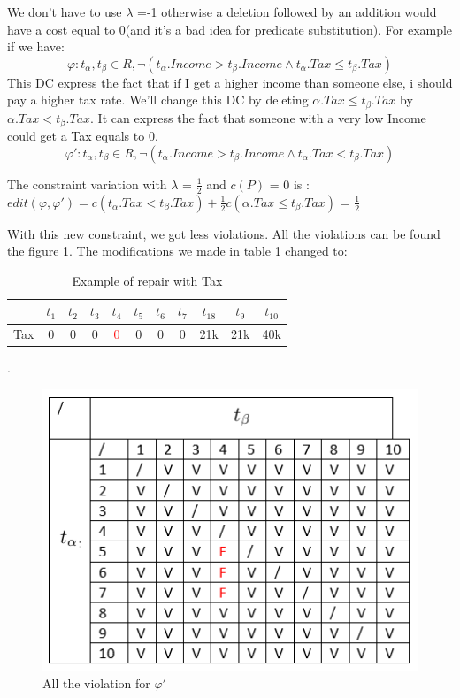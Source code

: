 \documentclass[letterpaper, 12pt]{report}
\begin{document}
We don't have to use $\lambda$ =-1 otherwise a deletion followed by an addition would have a cost equal to 0(and it's a bad idea for predicate substitution). For example if we have:
$$ \varphi : t_\alpha,t_\beta \in R, \neg(t_\alpha.Income > t_\beta.Income \wedge t_\alpha.Tax \leq t_\beta.Tax)$$
This DC express the fact that if I get a higher income than someone else, i should pay a higher tax rate. We'll change this DC by deleting $\alpha.Tax \leq t_\beta.Tax$ by $\alpha.Tax < t_\beta.Tax$. It can express the fact that someone with a very low Income could get a Tax equals to 0.
$$ \varphi ' : t_\alpha,t_\beta \in R, \neg(t_\alpha.Income > t_\beta.Income \wedge t_\alpha.Tax < t_\beta.Tax)$$

The constraint variation with $\lambda$ = $\frac{1}{2}$ and $c(P)$ = 0 is : $edit(\varphi, \varphi') = c(t_\alpha.Tax < t_\beta.Tax) + \frac{1}{2} c(\alpha.Tax \leq t_\beta.Tax)$ = $\frac{1}{2}$

With this new constraint, we got less violations. All the violations can be found the figure \ref{GoodTax}. The modifications we made in table \ref{tableExample} changed to:

\begin{table}[H]
	\centering
	\begin{tabular}{|c|c c c c c c c c c c|}
	\hline
	   & $t_1$ & $t_2$ & $t_3$ &$t_4$ &$t_5$ &$t_6$ &$t_7$ &$t_18$ &$t_9$ &$t_10$ \\
	\hline
	 Tax & 0 & 0 & 0 & \textcolor{red}{0} & 0 & 0 & 0 & 21k & 21k & 40k\\
	 \hline
	\end{tabular}
	\caption{\label{tableExample} Example of repair with Tax}.
\end{table}


\begin{figure}
	\centering
	\includegraphics[scale=1]{img/TaxGood}
	\caption{\label{GoodTax} All the violation for $\varphi '$}
\end{figure}
\end{document}
